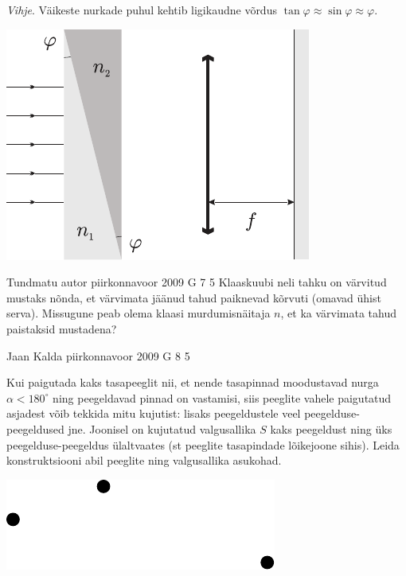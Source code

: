 \documentclass[11pt]{article}
\begin{document}
{{\emph{Vihje}. Väikeste nurkade puhul kehtib ligikaudne võrdus $\tan \varphi \approx \sin \varphi \approx \varphi $.

\begin{center}
	\includegraphics[width=0.6\linewidth]{2006-lahg-06-yl}
\end{center}
\fi
}

{Tundmatu autor} %
{piirkonnavoor} %
{2009} %
{G 7} %
{5} %
{
\ifStatement
Klaaskuubi neli tahku on värvitud mustaks nõnda,
et värvimata jäänud tahud paiknevad kõrvuti (omavad ühist serva). Missugune peab olema klaasi murdumisnäitaja $n$, et ka värvimata tahud
paistaksid mustadena?
\fi
}

{Jaan Kalda} %
{piirkonnavoor} %
{2009} %
{G 8} %
{5} %
{
\ifStatement
Kui paigutada kaks tasapeeglit nii, et nende tasapinnad moodustavad nurga $\alpha<180^\circ$ ning peegeldavad pinnad on vastamisi, siis peeglite vahele paigutatud asjadest võib tekkida mitu kujutist: lisaks peegeldustele veel peegelduse-peegeldused jne. Joonisel on kujutatud valgusallika $S$ kaks peegeldust ning üks peegelduse-peegeldus ülaltvaates (st peeglite tasapindade lõikejoone sihis). Leida konstruktsiooni abil peeglite ning valgusallika asukohad.\\

\begin{center}
	\includegraphics[width=0.6\linewidth]{2009-v2g-08-yl}
\end{center}
\fi
}

}
\end{document}
